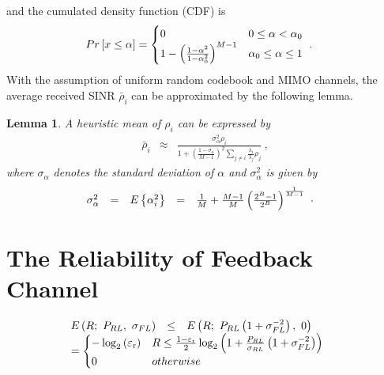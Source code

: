 \documentclass[10pt,fleqn, twocolumn]{IEEEtran}
\newtheorem{lemma}{Lemma}
\begin{document}
\noindent and the cumulated density function (CDF) is
\begin{equation}\hspace{-0.15in}
\begin{array}{l}
\mbox{Pr}\left[x\leq\alpha\right]=
\begin{cases}
0 & 0 \leq\alpha < \alpha_{0} \\
1-\left(\frac{1-\alpha^2}{1-\alpha_{0}^2}\right)^{M-1} &
\alpha_{0}\leq\alpha\leq 1
\end{cases}\ .
\end{array}
\end{equation}
\noindent With the assumption of uniform random codebook and MIMO
channels, the average received SINR $\bar\rho_{i}$ can be
approximated by the following lemma.
\begin{lemma} A heuristic mean of $\rho_{i}$
can be expressed by
\begin{equation}%
\begin{array}{rcl}
\bar\rho_{i}&\approx&\frac{\sigma_{\alpha}^{2}\rho_{i}}{1+
\left(\frac{1-\sigma_{\alpha}}{M-1}\right)^{2}\sum\limits_{j\neq
i}\frac{\lambda_{i}}{\lambda_{j}}\rho_{j}}\ ,
\end{array}
\end{equation}
\noindent where $\sigma_{\alpha}$ denotes the standard deviation
of $\alpha$ and $\sigma_{\alpha}^2$ is given by
\begin{equation}\hspace{-0.2in}
\begin{array}{rcccl}
\sigma_{\alpha}^2&=&\mbox{E}\left\{\alpha_{i}^2\right\}&=&\frac{1}{M}+\frac{M-1}{M}\left(\frac{2^B-1}{2^B}\right)^{\frac{1}{M-1}}
\end{array}.\label{sigma_alpha}
\end{equation}
\end{lemma}

\section{The Reliability of Feedback Channel}



\begin{equation}\hspace{-0.2in}
\begin{array}{rcl}
E\left(R;\ P_{\mbox{\tiny RL}},\ \sigma_{\mbox{\tiny
FL}}\right)&\leq& E\left(R;\ P_{\mbox{\tiny
RL}}\left(1+\sigma_{\mbox{\tiny
FL}}^{-2}\right),\ 0\right)\\
&\hspace{-2.40in}=&\hspace{-1.30in}
\begin{cases}
-\log_{2}\left(\varepsilon_{\rm r}\right) & R \leq
\frac{1-\varepsilon_{\rm
r}}{2}\log_{2}\left(1+\frac{P_{\mbox{\tiny
RL}}}{\sigma_{\mbox{\tiny RL}}}\left(1+\sigma_{\mbox{\tiny
FL}}^{-2}\right)\right) \\
0 & \mbox{otherwise}
\end{cases}
\end{array}
\end{equation}
\end{document}
